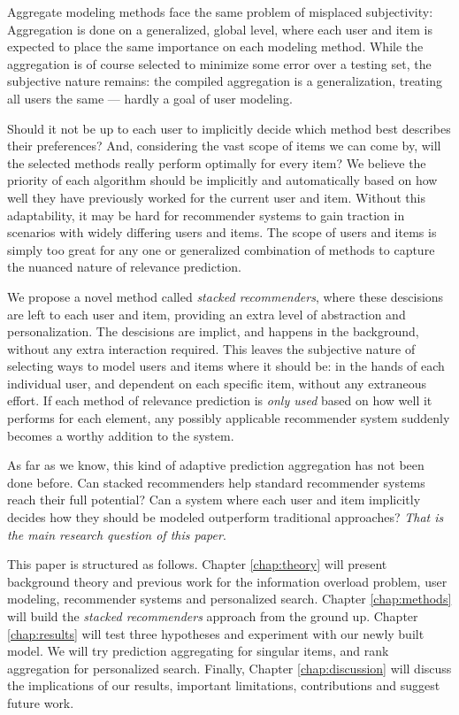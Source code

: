 Aggregate modeling methods face the same problem of misplaced subjectivity: 
Aggregation is done on a generalized, global level,
where each user and item is expected to place the same importance on each modeling method.
While the aggregation is of course selected to minimize some error over a testing set,
the subjective nature remains: the compiled aggregation is a generalization,
treating all users the same --- hardly a goal of user modeling.

Should it not be up to each user to implicitly decide which method best describes their preferences?
And, considering the vast scope of items we can come by, will the selected
methods really perform optimally for every item?
We believe the priority of each algorithm should be implicitly and automatically
based on how well they have previously worked for the current user and item.
Without this adaptability, it may be hard for recommender systems
to gain traction in scenarios with widely differing users and items.
The scope of users and items is simply too great for any one or generalized combination
of methods to capture the nuanced nature of relevance prediction.

We propose a novel method called \emph{stacked recommenders}, where these descisions are left to each user and item,
providing an extra level of abstraction and personalization.
The descisions are implict, and happens in the background, without any extra interaction required.
This leaves the subjective nature of selecting ways to model users and items where it should be:
in the hands of each individual user, and dependent on each specific item, without any extraneous effort.
If each method of relevance prediction is \emph{only used} based on how well it performs for each element,
any possibly applicable recommender system suddenly becomes a worthy addition to the system.

As far as we know, this kind of adaptive prediction aggregation has not been done before.
Can stacked recommenders help standard recommender systems reach their full potential?
Can a system where each user and item implicitly decides how they should be modeled outperform traditional approaches?
\emph{That is the main research question of this paper}.


This paper is structured as follows.
Chapter \ref{chap:theory} will present background theory and previous work for
the information overload problem, user modeling, recommender systems and personalized search. 
Chapter \ref{chap:methods} will build the \emph{stacked recommenders} approach from the ground up.
Chapter \ref{chap:results} will test three hypotheses and experiment with our newly built model.
We will try prediction aggregating for singular items, and rank aggregation for personalized search.
Finally, Chapter \ref{chap:discussion} will discuss the implications of our results,
important limitations, contributions and suggest future work.


